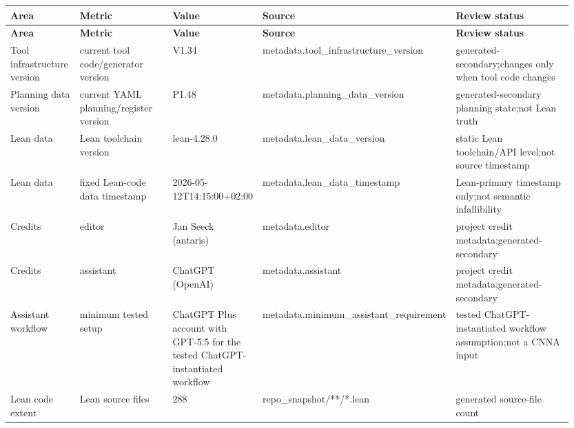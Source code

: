 \footnotesize
{}
\begin{longtable}{L{0.13\linewidth} L{0.205\linewidth} L{0.1\linewidth} L{0.235\linewidth} L{0.285\linewidth}}
\hline
\textbf{Area} & \textbf{Metric} & \textbf{Value} & \textbf{Source} & \textbf{Review status}\\
\hline
\endfirsthead
\hline
\textbf{Area} & \textbf{Metric} & \textbf{Value} & \textbf{Source} & \textbf{Review status}\\
\hline
\endhead
Tool infrastructure version & current tool code/\allowbreak{}generator version & V1.34 & metadata.tool\_infrastructure\_version & generated-secondary;\newline changes only when tool code changes\\
\hline
\addlinespace[0.24em]
Planning data version & current YAML planning/\allowbreak{}register version & P1.48 & metadata.planning\_data\_version & generated-secondary planning state;\newline not Lean truth\\
\hline
\addlinespace[0.24em]
Lean data & Lean toolchain version & lean-4.28.0 & metadata.lean\_data\_version & static Lean toolchain/\allowbreak{}API level;\newline not source timestamp\\
\hline
\addlinespace[0.24em]
Lean data & fixed Lean-code data timestamp & 2026-05-12T14:15:00+02:00 & metadata.lean\_data\_timestamp & Lean-primary timestamp only;\newline not semantic infallibility\\
\hline
\addlinespace[0.24em]
Credits & editor & Jan Seeck (antaris) & metadata.editor & project credit metadata;\newline generated-secondary\\
\hline
\addlinespace[0.24em]
Credits & assistant & ChatGPT (OpenAI) & metadata.assistant & project credit metadata;\newline generated-secondary\\
\hline
\addlinespace[0.24em]
Assistant workflow & minimum tested setup & ChatGPT Plus account with GPT-5.5 for the tested ChatGPT-instantiated workflow & metadata.minimum\_assistant\_requirement & tested ChatGPT-instantiated workflow assumption;\newline not a CNNA input\\
\hline
\addlinespace[0.24em]
Lean code extent & Lean source files & 288 & repo\_snapshot/\allowbreak{}**/\allowbreak{}*.lean & generated source-file count\\

\end{longtable}
